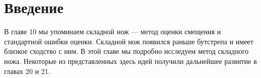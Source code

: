 \section{Введение}

В главе 10 мы упоминаем складной нож --- метод оценки смещения и стандартной ошибки оценки. Складной нож появился раньше бутстрепа и имеет близкое сходство с ним. В этой главе мы подробно исследуем метод складного ножа. Некоторые из представленных здесь идей получили дальнейшее развитие в главах 20 и 21.